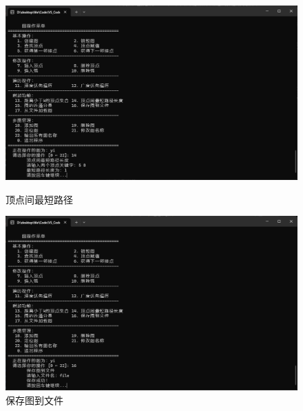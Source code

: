 \documentclass[supercite]{Experimental_Report}
\theoremstyle{definition}
\begin{document}
\begin{figure}[htb]
	\begin{center}
		\includegraphics[scale=0.30]{images/2-12.jpg}
		\caption{顶点间最短路径}
		\label{fig2-12}
	\end{center}

	\begin{center}
		\includegraphics[scale=0.30]{images/2-13.jpg}
		\caption{保存图到文件}
		\label{fig2-13}
	\end{center}
\end{figure}
\end{document}
